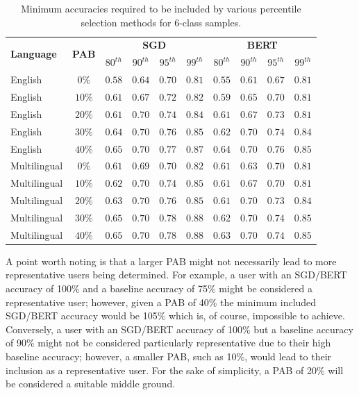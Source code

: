 \begin{table}[ht]
    \centering
    \begin{tabular}{l | c | c c c c | c c c c}
        \toprule
        \multirow{2}{*}{\textbf{Language}}&\multirow{2}{*}{\textbf{PAB}}&\multicolumn{4}{c}{\textbf{SGD}}&\multicolumn{4}{|c}{\textbf{BERT}}\\
        &&\textbf{$80^{th}$} & \textbf{$90^{th}$} & \textbf{$95^{th}$} & \textbf{$99^{th}$} & \textbf{$80^{th}$} & \textbf{$90^{th}$} & \textbf{$95^{th}$} & \textbf{$99^{th}$}\\\midrule
        English&$0\%$&$0.58$&$0.64$&$0.70$&$0.81$&$0.55$&$0.61$&$0.67$&$0.81$\\
        English&$10\%$&$0.61$&$0.67$&$0.72$&$0.82$&$0.59$&$0.65$&$0.70$&$0.81$\\
        English&$20\%$&$0.61$&$0.70$&$0.74$&$0.84$&$0.61$&$0.67$&$0.73$&$0.81$\\
        English&$30\%$&$0.64$&$0.70$&$0.76$&$0.85$&$0.62$&$0.70$&$0.74$&$0.84$\\
        English&$40\%$&$0.65$&$0.70$&$0.77$&$0.87$&$0.64$&$0.70$&$0.76$&$0.85$\\\midrule
        Multilingual&$0\%$&$0.61$&$0.69$&$0.70$&$0.82$&$0.61$&$0.63$&$0.70$&$0.81$\\
        Multilingual&$10\%$&$0.62$&$0.70$&$0.74$&$0.85$&$0.61$&$0.67$&$0.70$&$0.81$\\
        Multilingual&$20\%$&$0.63$&$0.70$&$0.76$&$0.85$&$0.61$&$0.70$&$0.73$&$0.84$\\
        Multilingual&$30\%$&$0.65$&$0.70$&$0.78$&$0.88$&$0.62$&$0.70$&$0.74$&$0.85$\\
        Multilingual&$40\%$&$0.65$&$0.70$&$0.78$&$0.88$&$0.63$&$0.70$&$0.74$&$0.85$\\
        \bottomrule
    \end{tabular}
    \caption{Minimum accuracies required to be included by various percentile selection methods for 6-class samples.}
    \label{tab:Res_PU_Pcts6}
\end{table}

A point worth noting is that a larger PAB might not necessarily lead to more representative users being determined. For example, a user with an SGD/BERT accuracy of 100\% and a baseline accuracy of 75\% might be considered a representative user; however, given a PAB of 40\% the minimum included SGD/BERT accuracy would be 105\% which is, of course, impossible to achieve. Conversely, a user with an SGD/BERT accuracy of 100\% but a baseline accuracy of 90\% might not be considered particularly representative due to their high baseline accuracy; however, a smaller PAB, such as 10\%, would lead to their inclusion as a representative user. For the sake of simplicity, a PAB of 20\% will be considered a suitable middle ground.


